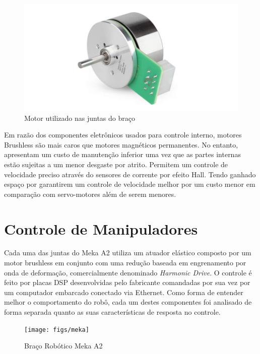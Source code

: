 \begin{figure}[H]
    \centering
    \includegraphics[width = 0.6\linewidth]{figs/maxon_flat_servo.jpg}
    \caption{Motor utilizado nas juntas do braço}
    \label{fig:maxon-flat-servo}
\end{figure}

Em razão dos componentes eletrônicos usados para controle interno, motores Brushless são mais caros que motores magnéticos permanentes. No entanto, apresentam um custo de manutenção inferior uma vez que as partes internas estão sujeitas a um menor desgaste por atrito. Permitem um controle de velocidade preciso através do sensores de corrente por efeito Hall. Tendo ganhado espaço por garantirem um controle de velocidade melhor por um custo menor em comparação com servo-motores além de serem menores.


\section{Controle de Manipuladores}

Cada uma das juntas do Meka A2 utiliza um atuador elástico composto por um motor brushless em conjunto com uma redução baseada em engrenamento por onda de deformação, comercialmente denominado \textit{Harmonic Drive}. O controle é feito por placas DSP desenvolvidas pelo fabricante comandadas por sua vez por um computador embarcado conectado via Ethernet. Como forma de entender melhor o comportamento do robô, cada um destes componentes foi analisado de forma separada quanto as suas características de resposta no controle. 

\begin{figure}[H]
    \centering
    \texttt{[image: figs/meka]}
    \caption{Braço Robótico Meka A2}
    \label{fig:meka_arm}
\end{figure}

